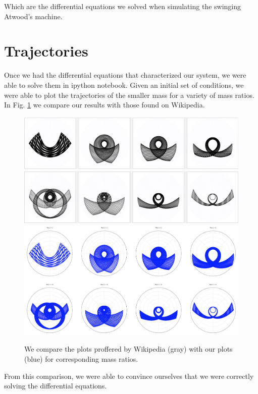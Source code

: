 \documentclass{article}
\begin{document}
Which are the differential equations we solved when simulating the swinging Atwood's machine.

\section*{Trajectories}

Once we had the differential equations that characterized our system, we were able to solve them in ipython notebook.  Given an initial set of conditions, we were able to plot the trajectories of the smaller mass for a variety of mass ratios.  In Fig. \ref{comparison} we compare our results with those found on Wikipedia.

\begin{figure}
\centering
\includegraphics[width=\textwidth]{topper}
\includegraphics[width=\textwidth]{bottom}
\includegraphics[width=\textwidth]{us}
\caption{We compare the plots proffered by Wikipedia (gray) with our plots (blue) for corresponding mass ratios.}
\label{comparison}
\end{figure}

From this comparison, we were able to convince ourselves that we were correctly solving the differential equations.
\end{document}
